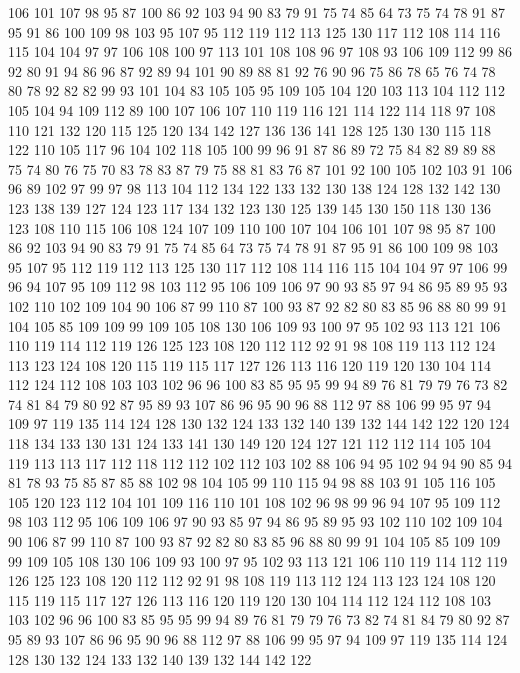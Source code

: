 106 101 107 98 95 87 100 86 92 103 94 90 83 79 91 75 74 85 64 73
75 74 78 91 87 95 91 86 100 109 98 103 95 107 95 112 119 112 113 125
130 117 112 108 114 116 115 104 104 97 97 106 108 100 97 113 101 108 108 96
97 108 93 106 109 112 99 86 92 80 91 94 86 96 87 92 89 94 101 90
89 88 81 92 76 90 96 75 86 78 65 76 74 78 80 78 92 82 82 99
93 101 104 83 105 105 95 109 105 104 120 103 113 104 112 112 105 104 94 109
112 89 100 107 106 107 110 119 116 121 114 122 114 118 97 108 110 121 132 120
115 125 120 134 142 127 136 136 141 128 125 130 130 115 118 122 110 105 117 96
104 102 118 105 100 99 96 91 87 86 89 72 75 84 82 89 89 88 75 74
80 76 75 70 83 78 83 87 79 75 88 81 83 76 87 101 92 100 105 102
103 91 106 96 89 102 97 99 97 98 113 104 112 134 122 133 132 130 138 124
128 132 142 130 123 138 139 127 124 123 117 134 132 123 130 125 139 145 130 150
118 130 136 123 108 110 115 106 108 124 107 109 110 100 107 104 106 101 107 98
95 87 100 86 92 103 94 90 83 79 91 75 74 85 64 73 75 74 78 91
87 95 91 86 100 109 98 103 95 107 95 112 119 112 113 125 130 117 112 108
114 116 115 104 104 97 97 106 99 96 94 107 95 109 112 98 103 112 95 106
109 106 97 90 93 85 97 94 86 95 89 95 93 102 110 102 109 104 90 106
87 99 110 87 100 93 87 92 82 80 83 85 96 88 80 99 91 104 105 85
109 109 99 109 105 108 130 106 109 93 100 97 95 102 93 113 121 106 110 119
114 112 119 126 125 123 108 120 112 112 92 91 98 108 119 113 112 124 113 123
124 108 120 115 119 115 117 127 126 113 116 120 119 120 130 104 114 112 124 112
108 103 103 102 96 96 100 83 85 95 95 99 94 89 76 81 79 79 76 73
82 74 81 84 79 80 92 87 95 89 93 107 86 96 95 90 96 88 112 97
88 106 99 95 97 94 109 97 119 135 114 124 128 130 132 124 133 132 140 139
132 144 142 122 120 124 118 134 133 130 131 124 133 141 130 149 120 124 127 121
112 112 114 105 104 119 113 113 117 112 118 112 112 102 112 103 102 88 106 94
95 102 94 94 90 85 94 81 78 93 75 85 87 85 88 102 98 104 105 99
110 115 94 98 88 103 91 105 116 105 105 120 123 112 104 101 109 116 110 101
108 102 96 98 99 96 94 107 95 109 112 98 103 112 95 106 109 106 97 90
93 85 97 94 86 95 89 95 93 102 110 102 109 104 90 106 87 99 110 87
100 93 87 92 82 80 83 85 96 88 80 99 91 104 105 85 109 109 99 109
105 108 130 106 109 93 100 97 95 102 93 113 121 106 110 119 114 112 119 126
125 123 108 120 112 112 92 91 98 108 119 113 112 124 113 123 124 108 120 115
119 115 117 127 126 113 116 120 119 120 130 104 114 112 124 112 108 103 103 102
96 96 100 83 85 95 95 99 94 89 76 81 79 79 76 73 82 74 81 84
79 80 92 87 95 89 93 107 86 96 95 90 96 88 112 97 88 106 99 95
97 94 109 97 119 135 114 124 128 130 132 124 133 132 140 139 132 144 142 122
